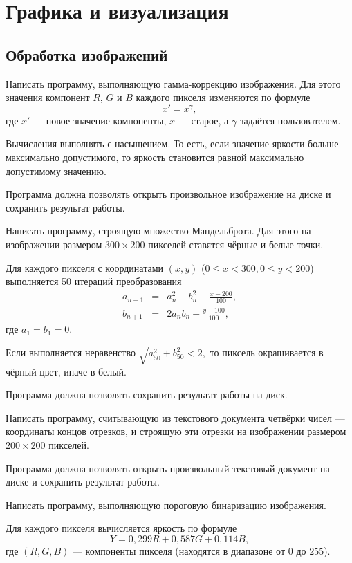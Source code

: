 \section{Графика и визуализация}

\subsection{Обработка изображений}

\task Написать программу, выполняющую гамма-коррекцию
изображения. Для этого значения
компонент $R$, $G$ и $B$ каждого пикселя изменяются по формуле
\[
x'=x^{\gamma},
\]
где $x'$ — новое значение компоненты, $x$ — старое, а $\gamma$
задаётся пользователем.

Вычисления выполнять с насыщением. То есть, если значение яркости
больше максимально допустимого, то яркость становится равной
максимально допустимому значению.

Программа должна позволять открыть произвольное изображение на диске и
сохранить результат работы.

\task Написать программу, строящую множество
Мандельброта. Для этого на изображении
размером $300 \times 200$ пикселей ставятся чёрные и белые точки.

Для каждого пикселя с координатами $(x, y)$
($0\leqslant x < 300, 0\leqslant y < 200$) выполняется 50 итераций
преобразования
\begin{eqnarray*}
a_{n+1} &=& a_n^2 - b_n^2 + \frac{x - 200}{100},\\
b_{n+1} &=& 2 a_n b_n + \frac{y-100}{100},
\end{eqnarray*}
где $a_1=b_1=0.$

Если выполняется неравенство $\sqrt{a_{50}^2 + b_{50}^2} < 2,$ то
пиксель окрашивается в чёрный цвет, иначе в белый.

Программа должна позволять сохранить результат работы на диск.

\task Написать программу, считывающую из текстового документа четвёрки
чисел — координаты концов отрезков, и строящую эти отрезки на изображении
размером $200\times 200$ пикселей.

Программа должна позволять открыть произвольный текстовый документ на
диске и сохранить результат работы.

\task Написать программу, выполняющую пороговую бинаризацию
изображения.

Для каждого пикселя вычисляется яркость по формуле
\[
Y = 0{,}299 R + 0{,}587 G + 0{,}114 B,
\]
где $(R, G, B)$ — компоненты пикселя (находятся в диапазоне от $0$ до
$255$).

